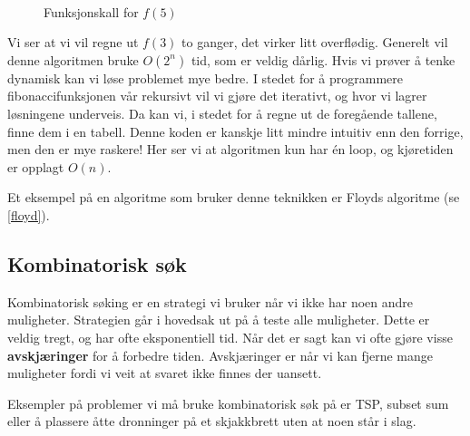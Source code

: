 \begin{figure}[H]
\caption{Funksjonskall for $ f(5) $}
\label{fig:fib_rekursivt}
\centering
~\\
\end{figure}

Vi ser at vi vil regne ut $ f(3) $ to ganger, det virker litt overflødig. Generelt vil denne algoritmen bruke $ O(2^n) $ tid, som er veldig dårlig. Hvis vi prøver å tenke dynamisk kan vi løse problemet mye bedre. I stedet for å programmere fibonaccifunksjonen vår rekursivt vil vi gjøre det iterativt, og hvor vi lagrer løsningene underveis. Da kan vi, i stedet for å regne ut de foregående tallene, finne dem i en tabell. 
Denne koden er kanskje litt mindre intuitiv enn den forrige, men den er mye raskere! Her ser vi at algoritmen kun har én loop, og kjøretiden er opplagt $ O(n) $.

Et eksempel på en algoritme som bruker denne teknikken er Floyds algoritme (se \ref{floyd}).




\subsection{Kombinatorisk søk}
Kombinatorisk søking er en strategi vi bruker når vi ikke har noen andre muligheter. Strategien går i hovedsak ut på å teste alle muligheter. Dette er veldig tregt, og har ofte eksponentiell tid. Når det er sagt kan vi ofte gjøre visse \textbf{avskjæringer} for å forbedre tiden. Avskjæringer er når vi kan fjerne mange muligheter fordi vi veit at svaret ikke finnes der uansett. 

Eksempler på problemer vi må bruke kombinatorisk søk på er TSP, subset sum eller å plassere åtte dronninger på et skjakkbrett uten at noen står i slag.